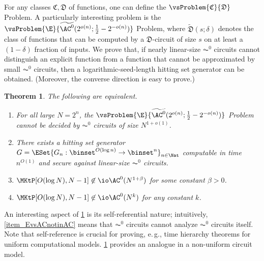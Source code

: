 \documentclass[11pt]{article}
\numberwithin{equation}{section}
\newtheorem{theorem}{Theorem}[section]
\theoremstyle{definition}
\theoremstyle{plain}
\newcommand{\eg}{e.\,g.}
\begin{document}
For any classes $\mathfrak{C}, \mathfrak{D}$ of functions,
one can define the $\vsProblem{\mathfrak{C}}{\mathfrak{D}}$ Problem.
A particularly interesting problem is
the $\vsProblem{\E}{\widetilde{\AC^0}(2^{o(n)}; \frac{1}{2} - 2^{- o(n)})}$ Problem,
where $\widetilde{\mathfrak{D}}(s; \delta)$
denotes the class of functions that can be computed by a $\mathfrak{D}$-circuit of size $s$
on at least a $(1 - \delta)$ fraction of inputs.
We prove
that, if nearly linear-size $\AC^0$ circuits cannot distinguish
an explicit function from a function that cannot be approximated by small
$\AC^0$ circuits,
then
a logarithmic-seed-length hitting set generator can be obtained.
(Moreover, the converse direction is easy to prove.)

\begin{theorem}
  \label{thm_ACEquiv}
  The following are equivalent.
  \begin{enumerate}
    \item
          \label{item_EvsACnotinAC}
          For all large $N = 2^n$,
          the $\vsProblem{\E}{\widetilde{\AC^0} (2^{o( n)} ; \frac{1}{2} - 2^{- o(n)})}$ Problem
          cannot be decided by $\AC^0$ circuits of size $N^{1 + o(1)}$.
    \item
          \label{item_AC0HSG}
          There exists a hitting set generator $G = \ESet{ G_n : \binset^{O(\log n)} \to \binset^n }_{n \in \Nat} $ computable in time $n^{O(1)}$ and secure against linear-size $\AC^0$ circuits.
    \item
          \label{item_MKtPnotinlinearAC}
          $\MKtP[O(\log N), N - 1] \not\in \io \AC^0(N^{1 + \beta})$ for some constant $\beta > 0$.
    \item
          \label{item_MKtPnotinAC}
          $\MKtP[O(\log N), N - 1] \not\in \io \AC^0(N^{k})$ for any constant $k$.
  \end{enumerate}
\end{theorem}

%
%
%
%
%
%
%
%
%
%
%
%
%

An interesting aspect of \cref{thm_ACEquiv} is its self-referential nature; intuitively, \cref{item_EvsACnotinAC} means that $\AC^0$ circuits cannot
analyze $\AC^0$ circuits itself.  Note that self-reference is crucial for proving, \eg, time hierarchy theorems for uniform computational models.  \cref{thm_ACEquiv} provides an analogue in a non-uniform circuit model.
\end{document}
